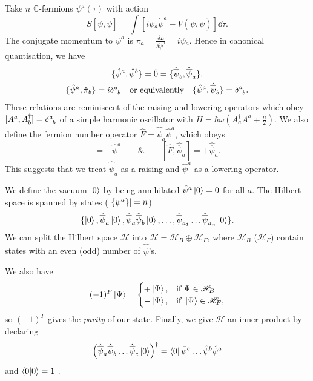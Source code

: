 Take $n$  $\mathbb{C}$-fermions $\psi^a(\tau)$  with action
\begin{equation}
  S[\overline{\psi}{}, \psi] = \int \left[ i \overline{\psi}{}_a \dot{\psi}^a - V(\overline{\psi}{}, \psi) \right] \dd \tau.
\end{equation}
The conjugate momentum to $\psi^a$ is  $\pi_a = \frac{\delta L}{\delta \dot{\psi}^a} = i \overline{\psi}{}_a$.
Hence in canonical quantisation, we have
\begin{gather}
  \{\hat{\psi}^a, \hat{\psi}^b\} = \hat{0} = \{\hat{\overline{\psi}{}}_b, \hat{\overline{\psi}{}}_a\}, \\
  \{\hat{\psi}^a, \hat{\pi}_b\} = i \delta\indices{^{a}_{b}} \quad \text{or equivalently}\quad \{\hat{\psi}^a, \hat{\overline{\psi}{}}_b\} = \delta\indices{^{a}_{b}}.
\end{gather}
These relations are reminiscent of the raising and lowering operators which obey $[A^a, A^{\dagger}_b] = \delta\indices{^{a}_{b}}$ of a simple harmonic oscillator with $H = \hbar \omega (A^{\dagger}_a A^{a} + \frac{n}{2})$.
We also define the fermion number operator $\hat{F} = \hat{\overline{\psi}{}}_a \hat{\psi}^a$, which obeys
\begin{equation}
  [\hat{F}, \hat{\psi}^a] = - \hat{\psi}^a \qquad \& \qquad [\hat{F}, \hat{\overline{\psi}{}}_a] = + \hat{\overline{\psi}{}}_a.
\end{equation}
This suggests that we treat $\hat{\overline{\psi}{}}_a$ as a raising and $\hat{\psi}^a$ as a lowering operator.

We define the vacuum $\ket{0}$ by being annihilated $\hat\psi^a\ket{0} = 0$ for all $a$.
The Hilbert space is spanned by states ($\abs{\{\psi^a\}} = n$)
\begin{equation}
  \{\ket{0}, \hat{\overline{\psi}}_a \ket{0}, \hat{\overline{\psi}}_a \hat{\overline{\psi}}_b \ket{0}, \dots, \hat{\overline{\psi}}_{a_1} \dots \hat{\overline{\psi}}_{a_n} \ket{0} \}.
\end{equation}
We can split the Hilbert space $\mathscr{H}$  into $\mathscr{H} = \mathscr{H}_B \oplus \mathscr{H}_F$, where $\mathscr{H}_B$  ($\mathscr{H}_F$) contain states with an even (odd) number of $\hat{\overline{\psi}}$'s.

We also have
 \begin{equation}
  (-1)^F \ket{\Psi} = 
  \begin{cases}
    + \ket{\Psi}, & \text{if } \Psi \in \mathscr{H}_B \\
    - \ket{\Psi}, & \text{if } \ket{\Psi} \in \mathscr{H}_F,
  \end{cases}
\end{equation}
so $(-1)^F$  gives the \emph{parity} of our state. Finally, we give $\mathscr{H}$  an inner product by declaring
\begin{equation}
  \left( \hat{\overline{\psi}}_{a} \hat{\overline{\psi}}_{b} \dots \hat{\overline{\psi}}_{c} \ket{0} \right)^{\dagger} = \bra{0} \hat{\psi}^{c} \dots \hat{\psi}^{b} \hat{\psi}^{a}
\end{equation}
and $\bra{0}\ket{0} = 1$ .

